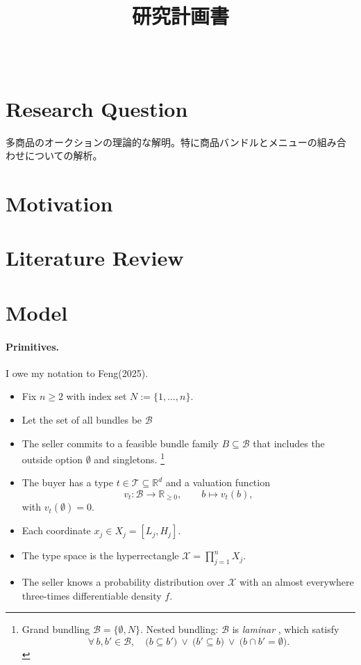 \documentclass[dvipdfmx,autodetect-engine]{article}
\title{研究計画書}
\author{\paperauthor \\ \paperaffil}
\date{\paperdate}
\newcommand{\B}{\mathcal{B}}
\begin{document}
\maketitle

\section*{Research Question}
多商品のオークションの理論的な解明。特に商品バンドルとメニューの組み合わせについての解析。

\section*{Motivation}


\section*{Literature Review}

\section*{Model}

\paragraph{Primitives.}
I owe my notation to Feng(2025).
\begin{itemize}
    \item Fix $n\ge 2$ with index set $N:=\{1,\dots,n\}$.
    \item Let the set of all bundles be $\B$
    \item The seller commits to a feasible bundle family $B \subseteq \B$ that includes the outside option $\emptyset$ and singletons.
    \footnote{Grand bundling $\B=\{\emptyset,N\}$. Nested bundling: $\B$ is \emph{laminar} , which satisfy 
        \[
            \forall\, b,b' \in \mathcal{B}, \quad 
            \bigl(b \subseteq b'\bigr) \ \lor\ 
            \bigl(b' \subseteq b\bigr) \ \lor\ 
            \bigl(b \cap b' = \emptyset\bigr).
        \]}
    \item The buyer has a type $t \in \mathcal{T} \subseteq \mathbb{R}^d$ and a valuation function
    \[
        v_t : \mathcal{B} \to \mathbb{R}_{\ge 0}, \qquad b \mapsto v_t(b),
    \]
    with $v_t(\emptyset) = 0$.
    \item Each coordinate $x_j \in X_j = [L_j, H_j]$.
    \item The type space is the hyperrectangle $\mathcal{X}= \prod_{j=1}^n X_j$.
    \item The seller knows a probability distribution over $\mathcal{X}$ with an almost everywhere three-times differentiable density $f$.
\end{itemize}
\end{document}
